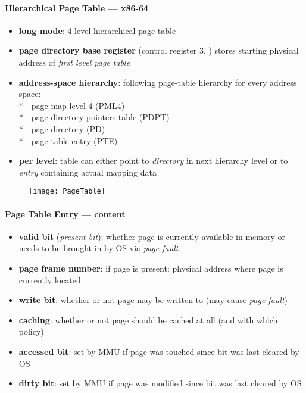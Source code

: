 \paragraph{Hierarchical Page Table --- x86-64}
\begin{itemize}
  \item \textbf{long mode}: 4-level hierarchical page table
  \item \textbf{page directory base register} (control register 3, ) stores starting physical address of \emph{first level page table}
  \item \textbf{address-space hierarchy}: following page-table hierarchy for every address space: \\*
    - page map level 4 (PML4) \\*
    - page directory pointers table (PDPT) \\*
    - page directory (PD) \\*
    - page table entry (PTE)
  \item \textbf{per level}: table can either point to \emph{directory} in next hierarchy level or to \emph{entry} containing actual mapping data
\end{itemize}
\begin{figure}[h]\centering\label{PageTable}\texttt{[image: PageTable]}\end{figure}

\paragraph{Page Table Entry --- content}
\begin{itemize}
  \item \textbf{valid bit} (\emph{present bit}): whether page is currently available in memory or needs to be brought in by OS via \emph{page fault}
  \item \textbf{page frame number}: if page is present: physical address where page is currently located
  \item \textbf{write bit}: whether or not page may be written to (may cause \emph{page fault})
  \item \textbf{caching}: whether or not page should be cached at all (and with which policy)
  \item \textbf{accessed bit}: set by MMU if page was touched since bit was last cleared by OS
  \item \textbf{dirty bit}: set by MMU if page was modified since bit was last cleared by OS
\end{itemize}

